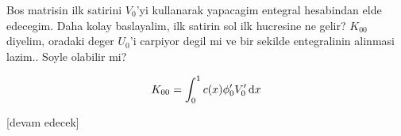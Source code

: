 \documentclass[12pt,fleqn]{article}\usepackage{../../common}
\begin{document}
Bos matrisin ilk satirini $V_0$'yi kullanarak yapacagim entegral hesabindan elde
edecegim. Daha kolay baslayalim, ilk satirin sol ilk hucresine ne gelir?
$K_{00}$ diyelim, oradaki deger $U_0$'i carpiyor degil mi ve bir sekilde
entegralinin alinmasi lazim.. Soyle olabilir mi?

$$
K_{00} = \int _{0}^{1} c(x) \phi_0' V_0' \,\mathrm{d} x
$$












[devam edecek]
\end{document}
